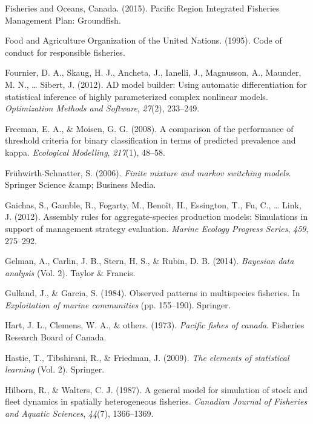 \documentclass[12pt,]{scrartcl}
\begin{document}
\hypertarget{ref-PRIFMP2015}{}
Fisheries and Oceans, Canada. (2015). Pacific Region Integrated
Fisheries Management Plan: Groundfish.

\hypertarget{ref-FAO1995}{}
Food and Agriculture Organization of the United Nations. (1995). Code of
conduct for responsible fisheries.

\hypertarget{ref-fournier2012ad}{}
Fournier, D. A., Skaug, H. J., Ancheta, J., Ianelli, J., Magnusson, A.,
Maunder, M. N., \ldots{} Sibert, J. (2012). AD model builder: Using
automatic differentiation for statistical inference of highly
parameterized complex nonlinear models. \emph{Optimization Methods and
Software}, \emph{27}(2), 233--249.

\hypertarget{ref-freeman2008comparison}{}
Freeman, E. A., \& Moisen, G. G. (2008). A comparison of the performance
of threshold criteria for binary classification in terms of predicted
prevalence and kappa. \emph{Ecological Modelling}, \emph{217}(1),
48--58.

\hypertarget{ref-fruhwirth2006finite}{}
Frühwirth-Schnatter, S. (2006). \emph{Finite mixture and markov
switching models}. Springer Science \&amp; Business Media.

\hypertarget{ref-gaichas2012assembly}{}
Gaichas, S., Gamble, R., Fogarty, M., Benoît, H., Essington, T., Fu, C.,
\ldots{} Link, J. (2012). Assembly rules for aggregate-species
production models: Simulations in support of management strategy
evaluation. \emph{Marine Ecology Progress Series}, \emph{459}, 275--292.

\hypertarget{ref-gelman2014bayesian}{}
Gelman, A., Carlin, J. B., Stern, H. S., \& Rubin, D. B. (2014).
\emph{Bayesian data analysis} (Vol. 2). Taylor \& Francis.

\hypertarget{ref-gulland1984observed}{}
Gulland, J., \& Garcia, S. (1984). Observed patterns in multispecies
fisheries. In \emph{Exploitation of marine communities} (pp. 155--190).
Springer.

\hypertarget{ref-hart1973pacific}{}
Hart, J. L., Clemens, W. A., \& others. (1973). \emph{Pacific fishes of
canada}. Fisheries Research Board of Canada.

\hypertarget{ref-hastie2009elements}{}
Hastie, T., Tibshirani, R., \& Friedman, J. (2009). \emph{The elements
of statistical learning} (Vol. 2). Springer.

\hypertarget{ref-hilborn1987general}{}
Hilborn, R., \& Walters, C. J. (1987). A general model for simulation of
stock and fleet dynamics in spatially heterogeneous fisheries.
\emph{Canadian Journal of Fisheries and Aquatic Sciences}, \emph{44}(7),
1366--1369.
\end{document}
